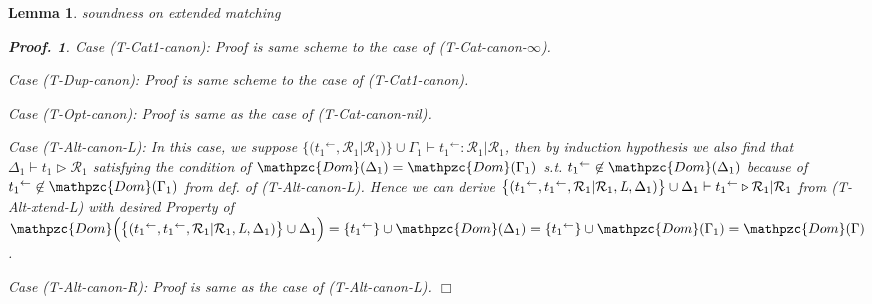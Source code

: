 \documentclass[12pt]{article}
\newtheorem{Lemma}{Lemma}[section]
\newtheorem{Proof}{Proof.}
\begin{document}
\begin{Lemma}{soundness on extended matching}
\begin{Proof}
    Case (T-Cat1-canon): Proof is same scheme to the case of
    (T-Cat-canon-$\infty$).
    
    Case (T-Dup-canon): Proof is same scheme to the case of (T-Cat1-canon).

    Case (T-Opt-canon): Proof is same as the case of (T-Cat-canon-nil).

    Case (T-Alt-canon-L): In this case, we suppose
    $\bigl\{({t_1}^\leftarrow, \mathcal{R}_1 | \mathcal{R}_1) \bigr\} \cup
    \Gamma_1 \vdash {t_1}^\leftarrow: \mathcal{R}_1 | \mathcal{R}_1$, then
    by induction hypothesis we also find that
    $\Delta_1 \vdash t_1 \triangleright \mathcal{R}_1$ satisfying the
    condition of $\mathpzc{Dom}(\Delta_1) = \mathpzc{Dom}(\Gamma_1)$ s.t.
    ${t_1}^\leftarrow \not\in \mathpzc{Dom}(\Delta_1)$ because of
    ${t_1}^\leftarrow \not\in \mathpzc{Dom}(\Gamma_1)$ from
    def. of (T-Alt-canon-L). Hence we can derive
    $\bigl\{({t_1}^\leftarrow, {t_1}^\leftarrow,
    \mathcal{R}_1 | \mathcal{R}_1, \text{\it L}, \Delta_1) \bigr\} \cup
    \Delta_1 \vdash {t_1}^\leftarrow \triangleright
    \mathcal{R}_1 | \mathcal{R}_1$ from (T-Alt-xtend-L) with desired
    Property of
    $\mathpzc{Dom}\Bigl(\bigl\{({t_1}^\leftarrow, {t_1}^\leftarrow,
    \mathcal{R}_1 | \mathcal{R}_1, \text{\it L}, \Delta_1) \bigr\} \cup
    \Delta_1 \Bigr) =
    \{{t_1}^\leftarrow\} \cup \mathpzc{Dom}(\Delta_1) =
    \{{t_1}^\leftarrow\} \cup \mathpzc{Dom}(\Gamma_1) =
    \mathpzc{Dom}(\Gamma)$.

    Case (T-Alt-canon-R): Proof is same as the case of (T-Alt-canon-L).
    $\Box$
  \end{Proof}      
\end{Lemma}
\end{document}
